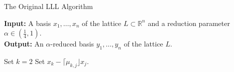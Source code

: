 \documentclass[11pt,letterpaper]{article}
\newcommand{\reals}{\mathbb{R}}
\theoremstyle{definition}
\begin{document}
\begin{algorithm}
\caption{The Original LLL Algorithm}
\textbf{Input: }A basis $x_1, \ldots, x_n$ of the lattice $L\subset \reals^n$ and a reduction parameter $\alpha\in (\frac{1}{4}, 1)$.\\
\textbf{Output: }An $\alpha$-reduced basis $y_1, \ldots, y_n$ of the lattice $L$.
\begin{algorithmic}[1]
	\State Set $k=2$
			\State Set $x_k - \lceil \mu_{k,j}\rfloor x_j$.
		\EndFor
	\EndWhile




\end{algorithmic}
\end{algorithm}
\end{document}
